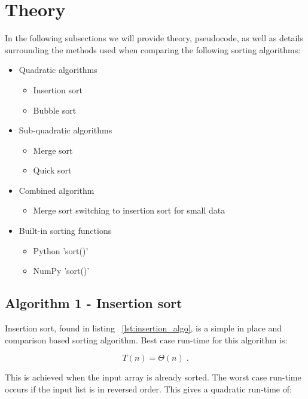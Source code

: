 \documentclass[sigconf, nonacm, natbib, screen, balance=False]{acmart}
\begin{document}
\section{Theory}\label{sec:theory}

In the following subsections we will provide theory, pseudocode, as well as details surrounding the methods used when comparing the following sorting algorithms: 

\begin{itemize}

\item Quadratic algorithms
  \begin{itemize}
  \item Insertion sort
  \item Bubble sort
  \end{itemize}
\item Sub-quadratic algorithms
  \begin{itemize}
  \item Merge sort
  \item Quick sort
  \end{itemize}
\item Combined algorithm
  \begin{itemize}
  \item Merge sort switching to insertion sort for small data
  \end{itemize}
\item Built-in sorting functions
  \begin{itemize}
  \item Python 'sort()'
  \item NumPy 'sort()'
  \end{itemize}
\end{itemize}

\subsection{Algorithm 1 - Insertion sort}\label{sec:algo1}
Insertion sort, found in listing ~\ref{lst:insertion_algo}, is a simple in place and comparison based sorting algorithm. Best case run-time for this algorithm is:

\begin{equation}
  T(n) = \Theta(n) \;.  \label{eq:ins_sort_best}
\end{equation}

This is achieved when the input array is already sorted. The worst case run-time occurs if the input list is in reversed order. This gives a quadratic run-time of:
\end{document}
